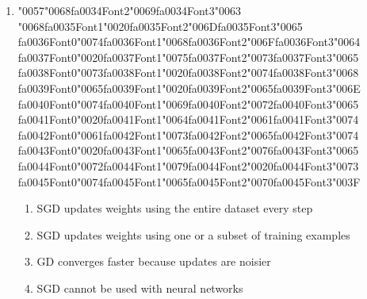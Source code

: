 \documentclass[12pt]{article}
\begin{document}
\begin{enumerate}[label=Q\arabic*.]
\item {\char"0057}{\char"0068}{\csname fa0034Font2\endcsname\char"0069}{\csname fa0034Font3\endcsname\char"0063} {\char"0068}{\csname fa0035Font1\endcsname\char"0020}{\csname fa0035Font2\endcsname\char"006D}{\csname fa0035Font3\endcsname\char"0065} {\csname fa0036Font0\endcsname\char"0074}{\csname fa0036Font1\endcsname\char"0068}{\csname fa0036Font2\endcsname\char"006F}{\csname fa0036Font3\endcsname\char"0064} {\csname fa0037Font0\endcsname\char"0020}{\csname fa0037Font1\endcsname\char"0075}{\csname fa0037Font2\endcsname\char"0073}{\csname fa0037Font3\endcsname\char"0065} {\csname fa0038Font0\endcsname\char"0073}{\csname fa0038Font1\endcsname\char"0020}{\csname fa0038Font2\endcsname\char"0074}{\csname fa0038Font3\endcsname\char"0068} {\csname fa0039Font0\endcsname\char"0065}{\csname fa0039Font1\endcsname\char"0020}{\csname fa0039Font2\endcsname\char"0065}{\csname fa0039Font3\endcsname\char"006E} {\csname fa0040Font0\endcsname\char"0074}{\csname fa0040Font1\endcsname\char"0069}{\csname fa0040Font2\endcsname\char"0072}{\csname fa0040Font3\endcsname\char"0065} {\csname fa0041Font0\endcsname\char"0020}{\csname fa0041Font1\endcsname\char"0064}{\csname fa0041Font2\endcsname\char"0061}{\csname fa0041Font3\endcsname\char"0074} {\csname fa0042Font0\endcsname\char"0061}{\csname fa0042Font1\endcsname\char"0073}{\csname fa0042Font2\endcsname\char"0065}{\csname fa0042Font3\endcsname\char"0074} {\csname fa0043Font0\endcsname\char"0020}{\csname fa0043Font1\endcsname\char"0065}{\csname fa0043Font2\endcsname\char"0076}{\csname fa0043Font3\endcsname\char"0065} {\csname fa0044Font0\endcsname\char"0072}{\csname fa0044Font1\endcsname\char"0079}{\csname fa0044Font2\endcsname\char"0020}{\csname fa0044Font3\endcsname\char"0073} {\csname fa0045Font0\endcsname\char"0074}{\csname fa0045Font1\endcsname\char"0065}{\csname fa0045Font2\endcsname\char"0070}{\csname fa0045Font3\endcsname\char"003F}
\begin{enumerate}[label=(\Alph*)]
    \item SGD updates weights using the entire dataset every step
    \item SGD updates weights using one or a subset of training examples
    \item GD converges faster because updates are noisier
    \item SGD cannot be used with neural networks
\end{enumerate}

\end{enumerate}
\end{document}
